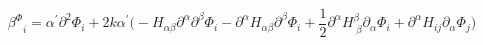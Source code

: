 \begin{equation}
{\beta^\Phi}_i=\alpha^\prime\partial^2\Phi_i+2k\alpha^\prime\bigl(-H_{\alpha\beta}
\partial^\alpha\partial^\beta\Phi_i-\partial^\alpha H_{\alpha\beta}
\partial^\beta\Phi_i+\frac{1}{2}\partial^\alpha
H_{\;\beta}^\beta\partial_\alpha\Phi_i+\partial^\alpha
H_{ij}\partial_\alpha\Phi_j\bigr)
\end{equation}

